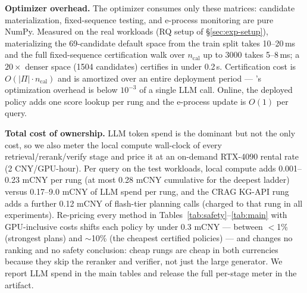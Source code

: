 \textbf{Optimizer overhead.} The optimizer consumes only these matrices:
candidate materialization, fixed-sequence testing, and e-process
monitoring are pure NumPy. Measured on the real workloads (RQ setup of
\S\ref{sec:exp-setup}), materializing the 69-candidate default space from
the train split takes 10--20\,ms and the full fixed-sequence
certification walk over $n_{\mathrm{cal}}$ up to 3000 takes 5--8\,ms; a
$20\times$ denser space (1504 candidates) certifies in under 0.2\,s.
Certification cost is $O(|\Pi|\cdot n_{\mathrm{cal}})$ and is amortized
over an entire deployment period --- \system's optimization overhead is
below $10^{-3}$ of a single LLM call. Online, the deployed policy adds
one score lookup per rung and the e-process update is $O(1)$ per query.

\textbf{Total cost of ownership.} LLM token spend is the dominant but not
the only cost, so we also meter the local compute wall-clock of every
retrieval/rerank/verify stage and price it at an on-demand RTX-4090
rental rate (2 CNY/GPU-hour). Per query on the test workloads, local
compute adds 0.001--0.23 mCNY per rung (at most 0.28 mCNY cumulative for
the deepest ladder) versus 0.17--9.0 mCNY of LLM spend per rung, and the
CRAG KG-API rung adds a further 0.12 mCNY of flash-tier planning calls
(charged to that rung in all experiments). Re-pricing every method in
Tables~\ref{tab:safety}--\ref{tab:main} with GPU-inclusive costs shifts
each policy by under 0.3 mCNY --- between $<$1\% (strongest plans) and
$\sim$10\% (the cheapest certified policies) --- and changes no ranking
and no safety conclusion: cheap rungs are cheap in both currencies
because they skip the reranker and verifier, not just the large
generator. We report LLM spend in the main tables and release the full
per-stage meter in the artifact.
